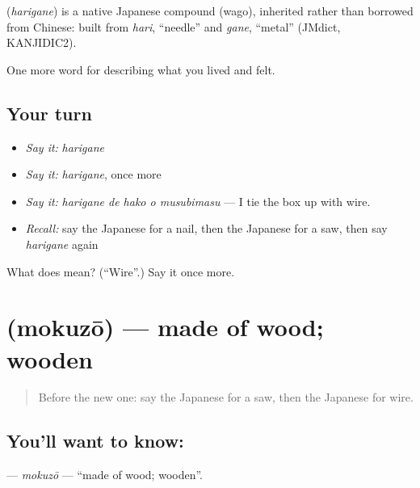 \begin{cousinweb}
\textbf{} (\emph{harigane}) is a native Japanese compound (wago), inherited rather than borrowed from Chinese: built from \emph{hari}, \textquotedblleft{}needle\textquotedblright{} and \emph{gane}, \textquotedblleft{}metal\textquotedblright{} (JMdict, KANJIDIC2).
\end{cousinweb}

\begin{grammarlens}[title={What you've built}]
One more word for describing what you lived and felt.
\end{grammarlens}

\subsection*{Your turn}
\begin{itemize}
\raggedright
  \item \emph{Say it:} \emph{harigane}
  \item \emph{Say it:} \emph{harigane}, once more
  \item \emph{Say it:} \emph{harigane de hako o musubimasu} — I tie the box up with wire.
  \item \emph{Recall:} say the Japanese for a nail, then the Japanese for a saw, then say \emph{harigane} again
\end{itemize}

\begin{tcolorbox}[breakable,colback=teal!4,colframe=teal!35!black,title={Before you move on}]
What does  mean? (\textquotedblleft{}Wire\textquotedblright{}.) Say it once more.
\end{tcolorbox}
\section[\texorpdfstring{\ja{もくぞう} (mokuzō)}{もくぞう (mokuzō)}]{ (mokuzō) — made of wood; wooden}

\label{lesson:JA-C482-mokuzou}



\begin{quote}
Before the new one: say the Japanese for a saw, then the Japanese for wire.
\end{quote}

\subsection*{You'll want to know: }
\textbf{} — \emph{mokuzō} — \textquotedblleft{}made of wood; wooden\textquotedblright{}.

